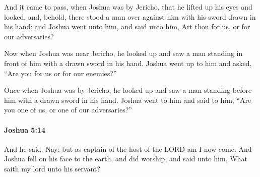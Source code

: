 			\begin{versebox}
					\item[BHS] 
					\item[ASV] And it came to pass, when Joshua was by Jericho, that he lifted up his eyes and looked, and, behold, there stood a man over against him with his sword drawn in his hand: and Joshua went unto him, and said unto him, Art thou for us, or for our adversaries?
					\item[NIV] Now when Joshua was near Jericho, he looked up and saw a man standing in front of him with a drawn sword in his hand. Joshua went up to him and asked, “Are you for us or for our enemies?”
					\item[NRSV] Once when Joshua was by Jericho, he looked up and saw a man standing before him with a drawn sword in his hand. Joshua went to him and said to him, “Are you one of us, or one of our adversaries?”
			\end{versebox}

		\paragraph{Joshua 5:14} %
			\label{JOSHUA-5-14}

			And he said, Nay; but as captain of the host of the LORD am I now come. And Joshua fell on his face to the earth, and did worship, and said unto him, What saith my lord unto his servant?

